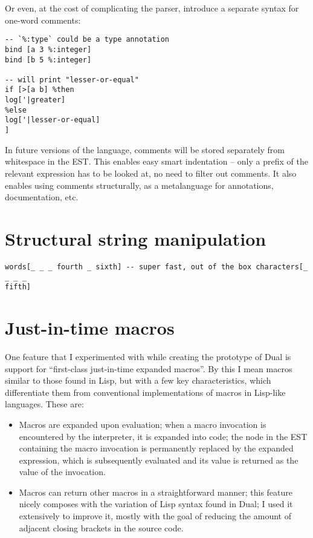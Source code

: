 Or even, at the cost of complicating the parser, introduce a separate syntax for
one-word comments:
\begin{lstlisting}
-- `%:type` could be a type annotation
bind [a 3 %:integer]
bind [b 5 %:integer]

-- will print "lesser-or-equal"
if [>[a b] %then
log['|greater]
%else
log['|lesser-or-equal]
]
\end{lstlisting}

In future versions of the language, comments will be stored separately from
whitespace in the EST. This enables easy smart indentation -- only a prefix of
the relevant expression has to be looked at, no need to filter out comments. It
also enables using comments structurally, as a metalanguage for annotations,
documentation, etc.

\section{Structural string manipulation}
\begin{lstlisting}
words[_ _ _ fourth _ sixth] -- super fast, out of the box characters[_ _ _ _
fifth]
\end{lstlisting}

\section{Just-in-time macros}
One feature that I experimented with while creating the prototype of Dual is
support for ``first-class just-in-time expanded macros''. By this I mean macros
similar to those found in Lisp, but with a few key characteristics, which
differentiate them from conventional implementations of macros in Lisp-like
languages. These are:
\begin{itemize}
    \item Macros are expanded upon evaluation; when a macro invocation is
    encountered by the interpreter, it is expanded into code; the node in
    the EST containing the macro invocation is permanently replaced by the
    expanded expression, which is subsequently evaluated and its value is
    returned as the value of the invocation.
    \item Macros can return other macros in a straightforward manner; this
    feature nicely composes with the variation of Lisp syntax found in
    Dual; I used it extensively to improve it, mostly with the goal of
    reducing the amount of adjacent closing brackets in the source code.
\end{itemize}

